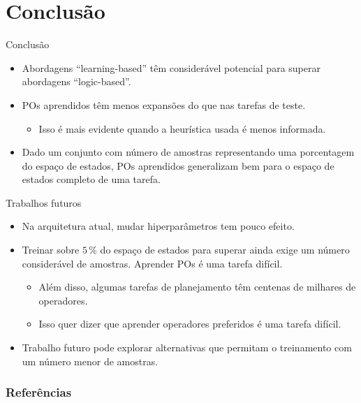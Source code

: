 \documentclass{beamer}
\begin{document}
\section{Conclusão}
\begin{frame}{Conclusão}
\begin{itemize}
  \item Abordagens ``learning-based'' têm considerável \alert{potencial} para superar abordagens ``logic-based''.
  \pause
  \item POs aprendidos \pog têm \alert{menos expansões} do que \poff nas tarefas de teste.
  \pause
    \begin{itemize}
      \item Isso é mais evidente quando a heurística usada é menos informada.
    \end{itemize}
  \pause
  \item Dado um conjunto com número de amostras representando uma porcentagem do espaço de estados, POs aprendidos \alert{generalizam bem} para o espaço de estados completo de uma tarefa.
\end{itemize}
\end{frame}

\begin{frame}{Trabalhos futuros}
\begin{itemize}
  \item Na arquitetura atual, mudar hiperparâmetros tem \alert{pouco efeito}.
  \pause
  \item Treinar sobre $5\,\%$ do espaço de estados para superar \poff ainda exige um número considerável de amostras. Aprender POs é uma tarefa \alert{difícil}.
  \begin{itemize}
    \pause
    \item Além disso, algumas tarefas de planejamento têm \alert{centenas de milhares de operadores}.
    \pause
    \item Isso quer dizer que aprender operadores preferidos é uma tarefa \alert{difícil}.
  \end{itemize}
  \pause
  \item Trabalho futuro pode explorar alternativas que permitam o treinamento com um \alert{número menor de amostras}.
\end{itemize}
\end{frame}


\begin{frame}[allowframebreaks]
\frametitle{Referências}
\printbibliography
\end{frame}
\end{document}
